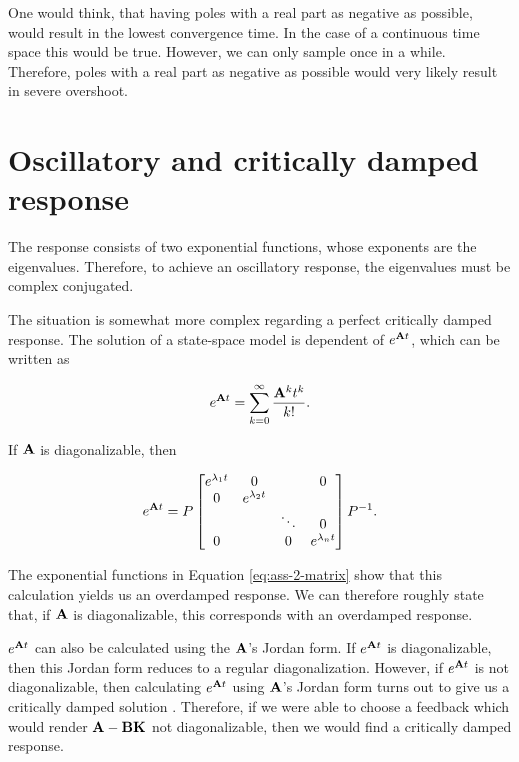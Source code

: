 \documentclass[11pt,titlepage]{report}
\begin{document}
One would think, that having poles with a real part as negative as possible, would result in the lowest convergence time. In the case of a continuous time space this would be true. However, we can only sample once in a while. Therefore, poles with a real part as negative as possible would very likely result in severe overshoot.

\section{Oscillatory and critically damped response}
\label{sec:ass-2-behav}
The response consists of two exponential functions, whose exponents are the eigenvalues. Therefore, to achieve an oscillatory response, the eigenvalues must be complex conjugated.

The situation is somewhat more complex regarding a perfect critically damped response. The solution of a state-space model is dependent of $e^{\mathbf{A} t}$, which can be written as

\begin{equation}
	e^{\mathbf{A} t} = \sum_{k=0}^{\infty} \frac{\mathbf{A}^k t^k}{k!}.
\end{equation}

If $\mathbf{A}$ is diagonalizable, then

\begin{equation} \label{eq:ass-2-matrix}
	e^{\mathbf{A} t} = P \begin{bmatrix}
		e^{\lambda_1 t} & 0 & & 0 \\
		0 & e^{\lambda_2 t} & & \\
		 & & \ddots & 0 \\
		 0 & & 0 & e^{\lambda_n t}
	\end{bmatrix} P^{-1}.
\end{equation}

The exponential functions in Equation \ref{eq:ass-2-matrix} show that this calculation yields us an overdamped response. We can therefore roughly state that, if $\mathbf{A}$ is diagonalizable, this corresponds with an overdamped response.

$e^{\mathbf{A} t}$ can also be calculated using the $\mathbf{A}$'s Jordan form. If $e^{\mathbf{A} t}$ is diagonalizable, then this Jordan form reduces to a regular diagonalization. However, if $e^{\mathbf{A} t}$ is not diagonalizable, then calculating $e^{\mathbf{A} t}$ using $\mathbf{A}$'s Jordan form turns out to give us a critically damped solution \cite{jordan-solution}. Therefore, if we were able to choose a feedback which would render $\mathbf{A} - \mathbf{B} \mathbf{K}$ not diagonalizable, then we would find a critically damped response.
\end{document}
